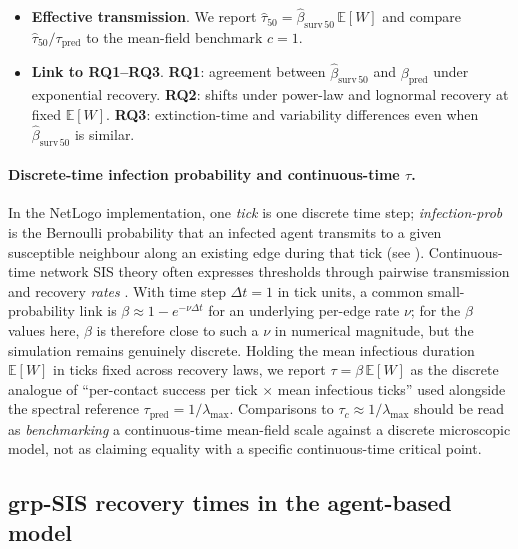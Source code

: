 \documentclass[11pt,a4paper]{article}
\begin{document}
\begin{itemize}[leftmargin=*]
  \item \textbf{Effective transmission}. We report $\hat{\tau}_{50}=\hat{\beta}_{\mathrm{surv}\,50}\,\mathbb{E}[W]$ and compare $\hat{\tau}_{50}/\tau_{\mathrm{pred}}$ to the mean-field benchmark $c{=}1$.

  \item \textbf{Link to RQ1--RQ3}. \textbf{RQ1}: agreement between $\hat{\beta}_{\mathrm{surv}\,50}$ and $\beta_{\mathrm{pred}}$ under exponential recovery. \textbf{RQ2}: shifts under power-law and lognormal recovery at fixed $\mathbb{E}[W]$. \textbf{RQ3}: extinction-time and variability differences even when $\hat{\beta}_{\mathrm{surv}\,50}$ is similar.
\end{itemize}

\paragraph{Discrete-time infection probability and continuous-time $\tau$.}
In the NetLogo implementation, one \emph{tick} is one discrete time step; \emph{infection-prob} is the Bernoulli probability that an infected agent transmits to a given susceptible neighbour along an existing edge during that tick (see ). Continuous-time network SIS theory often expresses thresholds through pairwise transmission and recovery \emph{rates} \cite{VanMieghem2011,PastorSatorras2015}. With time step $\Delta t=1$ in tick units, a common small-probability link is $\beta \approx 1-e^{-\nu \Delta t}$ for an underlying per-edge rate $\nu$; for the $\beta$ values here, $\beta$ is therefore close to such a $\nu$ in numerical magnitude, but the simulation remains genuinely discrete. Holding the mean infectious duration $\mathbb{E}[W]$ in ticks fixed across recovery laws, we report $\tau=\beta\,\mathbb{E}[W]$ as the discrete analogue of ``per-contact success per tick $\times$ mean infectious ticks'' used alongside the spectral reference $\tau_{\mathrm{pred}}=1/\lambda_{\max}$. Comparisons to $\tau_c\approx 1/\lambda_{\max}$ should be read as \emph{benchmarking} a continuous-time mean-field scale against a discrete microscopic model, not as claiming equality with a specific continuous-time critical point.

\subsection*{grp-SIS recovery times in the agent-based model}
\end{document}
